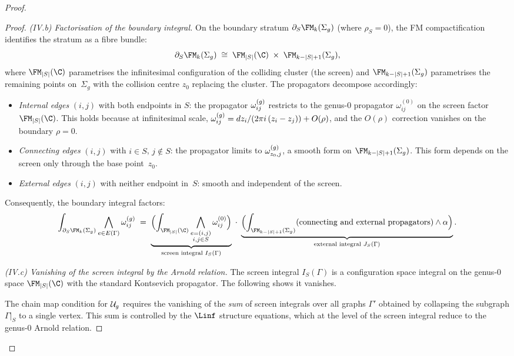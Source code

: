 \begin{proof}
\begin{proof}
\medskip\noindent
\emph{(IV.b) Factorisation of the boundary integral.}
On the boundary stratum $\partial_S\FMg{k}$
(where $\rho_S = 0$), the FM compactification identifies the
stratum as a fibre bundle:
\[
 \partial_S\FMg{k}
 \;\cong\;
 \FM_{|S|}(\C) \;\times\; \FMg{k - |S| + 1},
\]
where $\FM_{|S|}(\C)$ parametrises the infinitesimal
configuration of the colliding cluster (the screen) and
$\FMg{k - |S| + 1}$ parametrises the remaining points
on~$\Sigma_g$ with the collision centre $z_0$ replacing
the cluster. The propagators decompose accordingly:
\begin{itemize}
\item \emph{Internal edges} $(i,j)$ with both endpoints in $S$:
 the propagator $\omega^{(g)}_{ij}$ restricts to the genus-$0$
 propagator $\omega^{(0)}_{ij}$ on the screen factor
 $\FM_{|S|}(\C)$. This holds because at infinitesimal
 scale, $\omega^{(g)}_{ij} = dz_i / (2\pi i\,(z_i - z_j))
 + O(\rho)$, and the $O(\rho)$ correction vanishes on the
 boundary $\rho = 0$.

\item \emph{Connecting edges} $(i, j)$ with $i \in S$,
 $j \notin S$: the propagator limits to $\omega^{(g)}_{z_0, j}$,
 a smooth form on $\FMg{k - |S| + 1}$. This form depends
 on the screen only through the base point~$z_0$.

\item \emph{External edges} $(i,j)$ with neither endpoint in~$S$:
 smooth and independent of the screen.
\end{itemize}
Consequently, the boundary integral factors:
\begin{equation}\label{eq:boundary-factorisation}
 \int_{\partial_S\FMg{k}}
 \bigwedge_{e \in E(\Gamma)} \omhol_{ij}
 \;=\;
 \underbrace{\Bigl(
 \int_{\FM_{|S|}(\C)}
 \bigwedge_{\substack{e = (i,j) \\ i,j \in S}}
 \omega^{(0)}_{ij}
 \Bigr)}_{\text{screen integral } I_S(\Gamma)}
 \;\cdot\;
 \underbrace{\Bigl(
 \int_{\FMg{k - |S| + 1}}
 (\text{connecting and external propagators})
 \wedge \alpha
 \Bigr)}_{\text{external integral } J_S(\Gamma)}.
\end{equation}

\medskip\noindent
\emph{(IV.c) Vanishing of the screen integral by the Arnold
relation.}
The screen integral $I_S(\Gamma)$ is a configuration space
integral on the genus-$0$ space $\FM_{|S|}(\C)$ with the
standard Kontsevich propagator. The following shows it vanishes.

The chain map condition for
$\mathcal{U}_g$ requires the vanishing of the \emph{sum} of screen
integrals over all graphs $\Gamma'$ obtained by collapsing the
subgraph $\Gamma|_S$ to a single vertex. This sum is
controlled by the $\Linf$ structure equations, which at the
level of the screen integral reduce to the genus-$0$ Arnold
relation.


\end{proof}
\end{proof}
